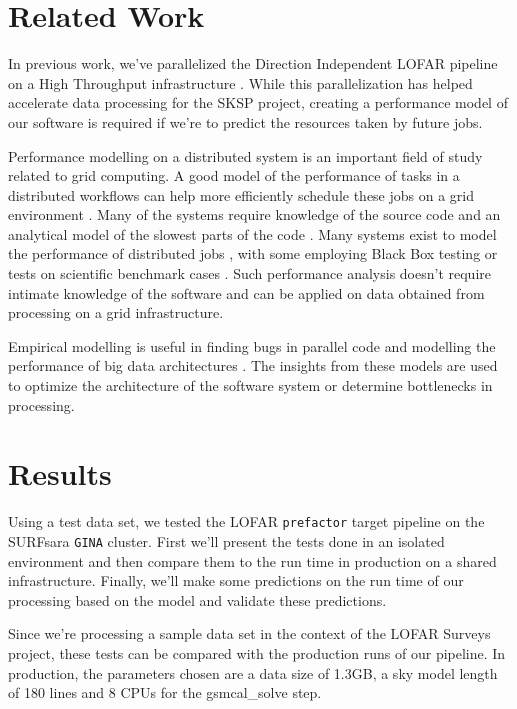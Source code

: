 \documentclass[preprint,5p]{elsarticle}
\begin{document}
\section{Related Work}\label{sec:related}
In previous work, we've parallelized the Direction Independent LOFAR pipeline on a High Throughput infrastructure \citep{mechev17}. While this parallelization has helped accelerate data processing for the SKSP project, creating a performance model of our software is required if we're to predict the resources taken by future jobs. 

Performance modelling on a distributed system is an important field of study related to grid computing. A good model of the performance of tasks in a distributed workflows can help more efficiently schedule these jobs on a grid environment \citep{grid_perform_model}. Many of the systems require knowledge of the source code and an analytical model of the slowest parts of the code \citep{semi_analytical_model}. Many systems exist to model the performance of distributed jobs \citep{barnes2008regression, semi_analytical_model,performance_prediction,Witt2018PredictivePM}, with some employing Black Box testing \citep{cross_platform_black_box, mapreduce_analysis} or tests on scientific benchmark cases \citep{synthetic_memory_prediction}. Such performance analysis doesn't require intimate knowledge of the software and can be applied on data obtained from processing on a grid infrastructure. 

Empirical modelling is useful in finding bugs in parallel code \citep{scalability_bugs} and modelling the performance of big data architectures \citep{mean_field_modeling}. The insights from these models are used to optimize the architecture of the software system or determine bottlenecks in processing. 



\section{Results}\label{sec:results}

Using a test data set, we tested the LOFAR \texttt{prefactor} target pipeline on the SURFsara \texttt{GINA} cluster. First we'll present the tests done in an isolated environment and then compare them to the run time in production on a shared infrastructure. Finally, we'll make some predictions on the run time of our processing based on the model and validate these predictions. 

Since we're processing a sample data set in the context of the LOFAR Surveys project, these tests can be compared with the production runs of our pipeline. In production, the parameters chosen are a data size of 1.3GB, a sky model length of 180 lines and 8 CPUs for the gsmcal\_solve step. 
\end{document}

